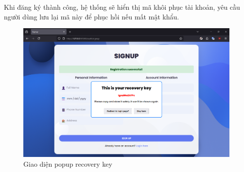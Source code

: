 Khi đăng ký thành công, hệ thống sẽ hiển thị mã khôi phục tài khoản, yêu cầu người dùng lưu lại mã này để phục hồi nếu mất mật khẩu.
\begin{figure}[H]
\centering
\includegraphics[scale=0.34]{img/recovery-key.png}
\caption{Giao diện popup recovery key}
\label{fig:recovery_key_ui}
\end{figure}

